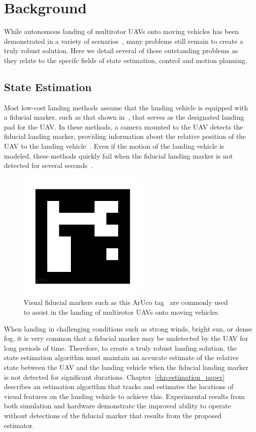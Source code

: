 \section{Background}

While autonomous landing of multirotor UAVs onto moving vehicles has been
demonstrated in a variety of scenarios~\cite{wynn2019visual}, many problems still remain to
create a truly robust solution. Here we detail several of these outstanding
problems as they relate to the specifc fields of state estimation, control and
motion planning.

\subsection{State Estimation}
Most low-cost landing methods assume that the landing vehicle is equipped with a
fiducial marker, such as that shown in~, that serves as
the designated landing pad for the UAV.
In these methods, a camera mounted to the UAV detects the fiducial landing marker, providing
information about the relative position of the UAV to the landing
vehicle~\cite{borowczyk2017autonomous}. Even if the motion of the landing vehicle is
modeled, these methods quickly fail when the fiducial landing
marker is not detected for several seconds~\cite{ling2014precision}.

\begin{figure}[t]
  \centering
  \includegraphics[width=2.5in]{figures/aruco_104.png}
  \caption[Visual Fiducial Landing Marker]{Visual fiducial markers such as this
    ArUco tag~\cite{garrido2016generation} are commonly used to assist in the
  landing of multirotor UAVs onto moving vehicles.}
  \label{fig:aruco_tag}
\end{figure}

When landing in challenging conditions such as strong winds, bright sun, or
dense fog, it is very common that a fiducial marker may be undetected by the UAV
for long periods of time. Therefore, to create a truly robust landing solution,
the state estimation algorithm must maintain an accurate estimate of the relative
state between the UAV and the landing vehicle when the fiducial landing marker
is not detected for significant durations. Chapter~\ref{chp:estimation_paper}
describes an estimation algorithm that tracks and estimates the locations of
visual features on the landing vehicle to achieve this. Experimental results
from both simulation and hardware demonstrate the improved ability to operate
without detections of the fiducial marker that results from the proposed
estimator.

